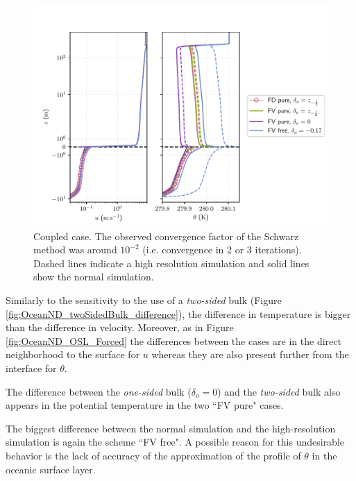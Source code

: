 \begin{figure}
	\centering
\includegraphics[scale=0.6]{images/oce_Coupled.pdf}
	\caption{Coupled case. The observed convergence factor
	of the Schwarz method was around $10^{-2}$
	(i.e. convergence in 2 or 3 iterations).
	Dashed lines indicate
	a high resolution simulation and solid lines
	show the normal simulation.}
	\label{fig:OceanND_OSL_Coupled}
\end{figure}
\par
Similarly to the sensitivity to the use of a \textit{two-sided}
bulk (Figure \ref{fig:OceanND_twoSidedBulk_difference}),
the difference in temperature is bigger than the difference in
velocity. Moreover, as in Figure \ref{fig:OceanND_OSL_Forced}
the differences between the cases are in the direct
neighborhood to the surface for $u$ whereas they are also
present further from the interface for $\theta$.
\par
The difference between the \textit{one-sided} bulk ($\delta_o= 0$)
and the \textit{two-sided} bulk also appears in the potential
temperature in the two ``FV pure" cases.
\par
The biggest difference between the normal simulation and the
high-resolution simulation is again the scheme ``FV free".
A possible reason for this undesirable behavior is the
lack of accuracy of the approximation
of the profile of $\theta$ in the oceanic surface layer.
